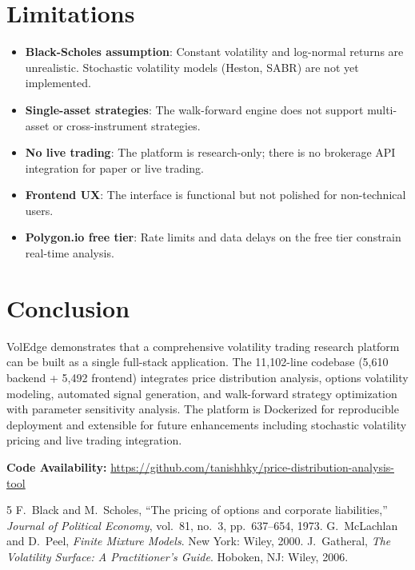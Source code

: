 \documentclass[11pt]{article}
\begin{document}
\section{Limitations}

\begin{itemize}[nosep]
    \item \textbf{Black-Scholes assumption}: Constant volatility and log-normal returns are unrealistic. Stochastic volatility models (Heston, SABR) are not yet implemented.
    \item \textbf{Single-asset strategies}: The walk-forward engine does not support multi-asset or cross-instrument strategies.
    \item \textbf{No live trading}: The platform is research-only; there is no brokerage API integration for paper or live trading.
    \item \textbf{Frontend UX}: The interface is functional but not polished for non-technical users.
    \item \textbf{Polygon.io free tier}: Rate limits and data delays on the free tier constrain real-time analysis.
\end{itemize}

\section{Conclusion}

VolEdge demonstrates that a comprehensive volatility trading research platform can be built as a single full-stack application. The 11,102-line codebase (5,610 backend + 5,492 frontend) integrates price distribution analysis, options volatility modeling, automated signal generation, and walk-forward strategy optimization with parameter sensitivity analysis. The platform is Dockerized for reproducible deployment and extensible for future enhancements including stochastic volatility pricing and live trading integration.

\medskip
\noindent\textbf{Code Availability:} \url{https://github.com/tanishhky/price-distribution-analysis-tool}

\begin{thebibliography}{5}
 F.~Black and M.~Scholes, ``The pricing of options and corporate liabilities,'' \textit{Journal of Political Economy}, vol.~81, no.~3, pp.~637--654, 1973.
 G.~McLachlan and D.~Peel, \textit{Finite Mixture Models}. New York: Wiley, 2000.
 J.~Gatheral, \textit{The Volatility Surface: A Practitioner's Guide}. Hoboken, NJ: Wiley, 2006.
\end{thebibliography}
\end{document}
